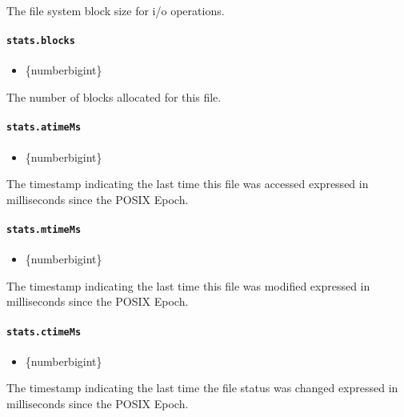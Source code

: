 The file system block size for i/o operations.

\paragraph{\texorpdfstring{\texttt{stats.blocks}}{stats.blocks}}\label{stats.blocks}

\begin{itemize}
\tightlist
\item
  \{number\textbar bigint\}
\end{itemize}

The number of blocks allocated for this file.

\paragraph{\texorpdfstring{\texttt{stats.atimeMs}}{stats.atimeMs}}\label{stats.atimems}

\begin{itemize}
\tightlist
\item
  \{number\textbar bigint\}
\end{itemize}

The timestamp indicating the last time this file was accessed expressed
in milliseconds since the POSIX Epoch.

\paragraph{\texorpdfstring{\texttt{stats.mtimeMs}}{stats.mtimeMs}}\label{stats.mtimems}

\begin{itemize}
\tightlist
\item
  \{number\textbar bigint\}
\end{itemize}

The timestamp indicating the last time this file was modified expressed
in milliseconds since the POSIX Epoch.

\paragraph{\texorpdfstring{\texttt{stats.ctimeMs}}{stats.ctimeMs}}\label{stats.ctimems}

\begin{itemize}
\tightlist
\item
  \{number\textbar bigint\}
\end{itemize}

The timestamp indicating the last time the file status was changed
expressed in milliseconds since the POSIX Epoch.


